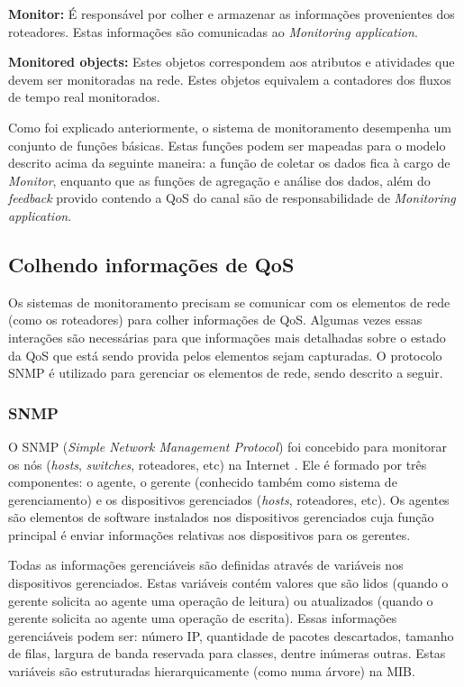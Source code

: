 \textbf{Monitor:} É responsável por colher e armazenar as informações provenientes dos roteadores. Estas informações são comunicadas ao \textit{Monitoring application}.

\textbf{Monitored objects:} Estes objetos correspondem aos atributos e atividades que devem ser monitoradas na rede. Estes objetos equivalem a contadores dos fluxos de tempo real monitorados.

	Como foi explicado anteriormente, o sistema de monitoramento desempenha um conjunto de funções básicas. Estas funções podem ser mapeadas para o modelo descrito acima da seguinte maneira: a função de coletar os dados fica à cargo de \textit{Monitor}, enquanto que as funções de agregação e análise dos dados, além do \textit{feedback} provido contendo a QoS do canal são de responsabilidade de \textit{Monitoring application}.

\subsection{Colhendo informações de QoS}
	Os sistemas de monitoramento precisam se comunicar com os elementos de rede (como os roteadores) para colher informações de QoS. Algumas vezes essas interações são necessárias para que informações mais detalhadas sobre o estado da QoS que está sendo provida pelos elementos sejam capturadas. O protocolo SNMP é utilizado para gerenciar os elementos de rede, sendo descrito a seguir.
	
\subsubsection{SNMP}

	O SNMP (\textit{Simple Network Management Protocol}) foi concebido para monitorar os nós (\textit{hosts}, \textit{switches}, roteadores, etc) na Internet \cite{CFSD90}. Ele é formado por três componentes: o agente, o gerente (conhecido também como sistema de gerenciamento) e os dispositivos gerenciados (\textit{hosts}, roteadores, etc). Os agentes são elementos de software instalados nos dispositivos gerenciados cuja função principal é enviar informações relativas aos dispositivos para os gerentes.
	
	Todas as informações gerenciáveis são definidas através de variáveis nos dispositivos gerenciados. Estas variáveis contém valores que são lidos (quando o gerente solicita ao agente uma operação de leitura) ou atualizados (quando o gerente solicita ao agente uma operação de escrita). Essas informações gerenciáveis podem ser: número IP, quantidade de pacotes descartados, tamanho de filas, largura de banda reservada para classes, dentre inúmeras outras. Estas variáveis são estruturadas hierarquicamente (como numa árvore) na MIB.
	
